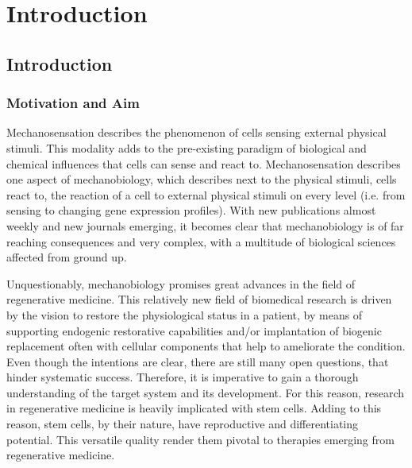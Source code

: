\newcommand{\package}{\emph}


\chapter{Introduction}

\section{Introduction}
\subsection{Motivation and Aim}
\label{sec:motivation}
Mechanosensation describes the phenomenon of cells sensing external physical stimuli.  This modality adds to the pre-existing paradigm of biological and chemical influences that cells can sense and react to. Mechanosensation describes one aspect of mechanobiology, which describes next to the physical stimuli, cells react to, the reaction of a cell to external physical stimuli on every level (i.e. from sensing to changing gene expression profiles).  With new publications almost weekly and new journals emerging, it becomes clear that mechanobiology is of far reaching consequences and very complex, with a multitude of biological sciences affected from ground up. 
\par 

Unquestionably, mechanobiology promises great advances in the field of regenerative medicine. This relatively new field of biomedical research is driven by the vision to restore the physiological status in a patient, by means of supporting endogenic restorative capabilities and/or implantation of biogenic replacement often with cellular components that help to ameliorate the condition.  Even though the intentions are clear, there are still many open questions, that hinder systematic success. Therefore, it is imperative to gain a thorough understanding of the target system and its development. For this reason, research in regenerative medicine is heavily implicated with stem cells. Adding to this reason, stem cells, by their nature, have reproductive and differentiating potential. This versatile quality render them pivotal to therapies emerging from regenerative medicine. \par

